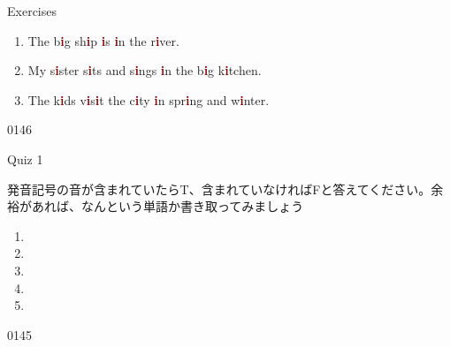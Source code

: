 \documentclass[aspectratio=169,xcolor={dvipsnames,table}]{beamer}
\begin{document}
\begin{frame}[plain]{Exercises }

\LARGE

\begin{enumerate}
 \item The b\textcolor{Maroon}{\bfseries i}g sh\textcolor{Maroon}{\bfseries i}p \textcolor{Maroon}{\bfseries i}s \textcolor{Maroon}{\bfseries i}n the r\textcolor{Maroon}{\bfseries i}ver.
 \item My s\textcolor{Maroon}{\bfseries i}ster s\textcolor{Maroon}{\bfseries i}ts and s\textcolor{Maroon}{\bfseries i}ngs \textcolor{Maroon}{\bfseries i}n the b\textcolor{Maroon}{\bfseries i}g k\textcolor{Maroon}{\bfseries i}tchen.
 \item The k\textcolor{Maroon}{\bfseries i}ds v\textcolor{Maroon}{\bfseries i}s\textcolor{Maroon}{\bfseries i}t the c\textcolor{Maroon}{\bfseries i}ty \textcolor{Maroon}{\bfseries i}n spr\textcolor{Maroon}{\bfseries i}ng and w\textcolor{Maroon}{\bfseries i}nter.

\end{enumerate}
\hfill{\tiny 0146}\,{\scriptsize {}}

\end{frame}
\begin{frame}[plain]{Quiz 1}

発音記号の音が含まれていたらT、含まれていなければFと答えてください。余裕があれば、なんという単語か書き取ってみましょう

\LARGE
\begin{enumerate}
 \item \mbox{}\hspace{40pt}\hspace{150pt}\mbox{}
 \item \mbox{}\hspace{40pt}\hspace{150pt}\mbox{}
 \item \mbox{}\hspace{40pt}\hspace{150pt}\mbox{}
 \item \mbox{}\hspace{40pt}\hspace{150pt}\mbox{}
 \item \mbox{}\hspace{40pt}\hspace{150pt}\mbox{}
\end{enumerate}
\hfill{\tiny 0145}\,{\scriptsize {}}

\end{frame}
\end{document}
